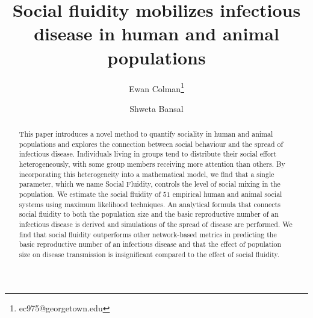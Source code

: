 \documentclass[10pt]{article}
\title{\vspace{-1.5cm}\sffamily Social fluidity mobilizes infectious disease in human and animal populations}
\date{}
\author[1]{Ewan Colman\footnote{ec975@georgetown.edu}}
\affil{\small{Department of Biology, Georgetown University, Washington, DC 20057, U.S.A}}
\author[1]{Shweta Bansal}
\begin{document}
\maketitle
\vspace{-0.7cm}
\begin{abstract}
\noindent\normalsize
This paper introduces a novel method to quantify sociality in human and animal populations and explores the connection between social behaviour and the spread of infectious disease. Individuals living in groups tend to distribute their social effort heterogeneously, with some group members receiving more attention than others. By incorporating this heterogeneity into a mathematical model, we find that a single parameter, which we name Social Fluidity, controls the level of social mixing in the population. We estimate the social fluidity of $51$ empirical human and animal social systems using maximum likelihood techniques. An analytical formula that connects social fluidity to both the population size and the basic reproductive number of an infectious disease is derived and simulations of the spread of disease are performed. We find that social fluidity outperforms other network-based metrics in predicting the basic reproductive number of an infectious disease and that the effect of population size on disease transmission is insignificant compared to the effect of social fluidity.
\end{abstract}
\vspace{0.5cm}
\end{document}
